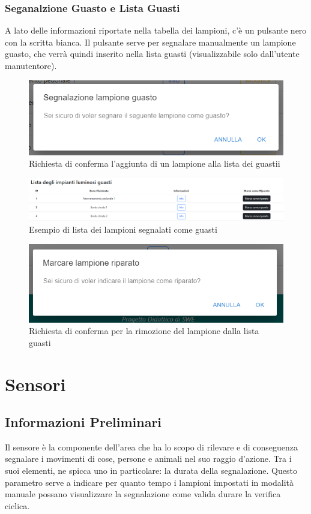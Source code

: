 \documentclass[a4paper, 12pt]{article}
\begin{document}
\subsubsection{Seganalzione Guasto e Lista Guasti}
A lato delle informazioni riportate nella tabella dei lampioni, c'è un pulsante nero con la scritta bianca. Il pulsante serve per segnalare manualmente un lampione guasto, che verrà quindi inserito nella lista guasti (visualizzabile solo dall'utente manutentore).
\begin{figure}[H]
\centering
\includegraphics[width=\textwidth]{ModaleGuastoLampione}
\caption{Richiesta di conferma l'aggiunta di un lampione alla lista dei guastii}
\end{figure}
\begin{figure}[H]
\centering
\includegraphics[width=\textwidth]{ListaGuastiVistaManutentore}
\caption{Esempio di lista dei lampioni segnalati come guasti}
\end{figure}
\begin{figure}[H]
\centering
\includegraphics[width=\textwidth]{ModaleRiparazioneLampione}
\caption{Richiesta di conferma per la rimozione del lampione dalla lista guasti}
\end{figure}

\newpage
\section{Sensori}
\subsection{Informazioni Preliminari}
Il sensore è la componente dell'area che ha lo scopo di rilevare e di conseguenza segnalare i movimenti di cose, persone e animali nel suo raggio d'azione. Tra i suoi elementi, ne spicca uno in particolare: la durata della segnalazione. Questo parametro serve a indicare per quanto tempo i lampioni impostati in modalità manuale possano visualizzare la segnalazione come valida durare la verifica ciclica.
\end{document}
